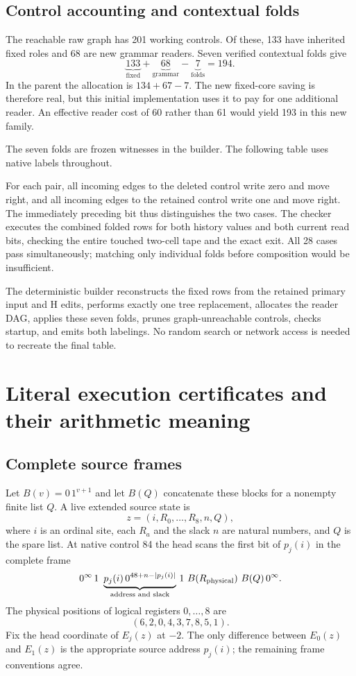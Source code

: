 \documentclass[10pt,a4paper]{article}
\theoremstyle{definition}
\begin{document}
\subsection{Control accounting and contextual folds}

The reachable raw graph has 201 working controls. Of these, 133 have
inherited fixed roles and 68 are new grammar readers. Seven verified
contextual folds give
\[
               \underbrace{133}_{\text{fixed}}+
               \underbrace{68}_{\text{grammar}}-
               \underbrace{7}_{\text{folds}}=194.
\]
In the parent the allocation is $134+67-7$. The new fixed-core saving is
therefore real, but this initial implementation uses it to pay for one
additional reader. An effective reader cost of 60 rather than 61 would
yield 193 in this new family.

The seven folds are frozen witnesses in the builder. The following table
uses native labels throughout.

For each pair, all incoming edges to the deleted control write zero and
move right, and all incoming edges to the retained control write one
and move right. The immediately preceding bit thus distinguishes the
two cases. The checker executes the combined folded rows for both history
values and both current read bits, checking the entire touched two-cell
tape and the exact exit. All 28 cases pass simultaneously; matching only
individual folds before composition would be insufficient.

The deterministic builder reconstructs the fixed rows from the retained
primary input and H edits, performs exactly one tree replacement, allocates
the reader DAG, applies these seven folds, prunes graph-unreachable
controls, checks startup, and emits both labelings. No random search or
network access is needed to recreate the final table.

\section{Literal execution certificates and their arithmetic meaning}
\label{sec:physical}

\subsection{Complete source frames}

Let $B(v)=0\,1^{v+1}$ and let $B(Q)$ concatenate these blocks for a
nonempty finite list $Q$. A live extended source state is
\[
 z=(i,R_0,\ldots,R_8,n,Q),
\]
where $i$ is an ordinal site, each $R_a$ and the slack $n$ are natural
numbers, and $Q$ is the spare list. At native control 84 the head scans
the first bit of $p_j(i)$ in the complete frame
\[
 0^\infty\,1\ \underbrace{p_j(i)\,0^{48+n-|p_j(i)|}}_{\text{address and slack}}
 \,1\ B(R_{\rm physical})\ B(Q)\,0^\infty.
\]
The physical positions of logical registers $0,\ldots,8$ are
\[
                  (6,2,0,4,3,7,8,5,1).
\]
Fix the head coordinate of $E_j(z)$ at $-2$. The only difference between $E_0(z)$ and $E_1(z)$ is the appropriate
source address $p_j(i)$; the remaining frame conventions agree.
\end{document}

